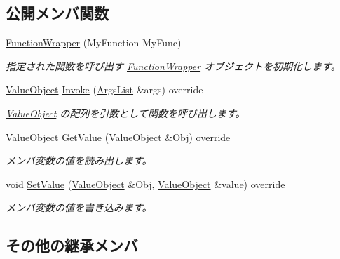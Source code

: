 \subsection*{公開メンバ関数}
\begin{DoxyCompactItemize}
\item 
\hyperlink{class_reflection_1_1_function_wrapper_3_01_ret_type_07_owner_type_1_1_5_08_4_a64ab487876f0816edfb3bc305aadd201}{Function\+Wrapper} (My\+Function My\+Func)
\begin{DoxyCompactList}\small\item\em 指定された関数を呼び出す \hyperlink{class_reflection_1_1_function_wrapper}{Function\+Wrapper} オブジェクトを初期化します。\end{DoxyCompactList}\item 
\hyperlink{class_reflection_1_1_value_object}{Value\+Object} \hyperlink{class_reflection_1_1_function_wrapper_3_01_ret_type_07_owner_type_1_1_5_08_4_a0b188062b8e2aa883f2ffaebdf87d987}{Invoke} (\hyperlink{_reflector_helper_8hpp_a83512919cd42ea73553f4d173e7ace4c}{Args\+List} \&args) override
\begin{DoxyCompactList}\small\item\em \hyperlink{class_reflection_1_1_value_object}{Value\+Object} の配列を引数として関数を呼び出します。\end{DoxyCompactList}\item 
\hyperlink{class_reflection_1_1_value_object}{Value\+Object} \hyperlink{class_reflection_1_1_function_wrapper_3_01_ret_type_07_owner_type_1_1_5_08_4_a3a7c1dda0b06ef0ccdfebfea1bdc89a7}{Get\+Value} (\hyperlink{class_reflection_1_1_value_object}{Value\+Object} \&Obj) override
\begin{DoxyCompactList}\small\item\em メンバ変数の値を読み出します。\end{DoxyCompactList}\item 
void \hyperlink{class_reflection_1_1_function_wrapper_3_01_ret_type_07_owner_type_1_1_5_08_4_a4ab816181f6d22687f712f13440b3b5e}{Set\+Value} (\hyperlink{class_reflection_1_1_value_object}{Value\+Object} \&Obj, \hyperlink{class_reflection_1_1_value_object}{Value\+Object} \&value) override
\begin{DoxyCompactList}\small\item\em メンバ変数の値を書き込みます。\end{DoxyCompactList}\end{DoxyCompactItemize}
\subsection*{その他の継承メンバ}


